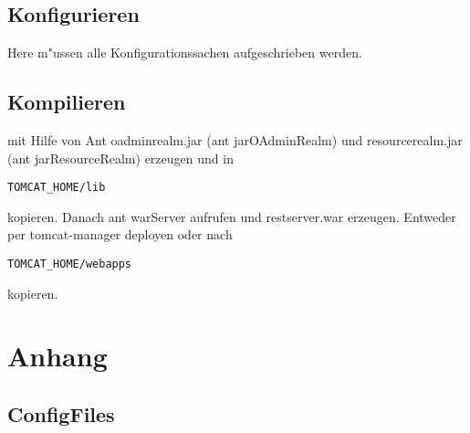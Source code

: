 \documentclass[a4paper,12pt]{scrreprt}
\begin{document}
\section{Konfigurieren}
Here m"ussen alle Konfigurationssachen aufgeschrieben werden.
\section{Kompilieren}
mit Hilfe von Ant oadminrealm.jar (ant jarOAdminRealm) und resourcerealm.jar (ant jarResourceRealm) erzeugen und in \begin{verbatim}TOMCAT_HOME/lib\end{verbatim} kopieren. Danach ant warServer aufrufen und restserver.war erzeugen. Entweder per tomcat-manager deployen oder nach \begin{verbatim}TOMCAT_HOME/webapps\end{verbatim} kopieren.
\chapter{Anhang}
\section{ConfigFiles}
\end{document}
